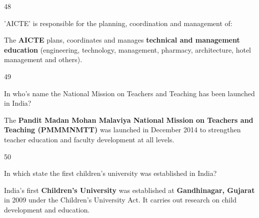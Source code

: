 \begin{question}{48}
{'AICTE' is responsible for the planning, coordination and management of:\par}
\begin{explain}
The \textbf{AICTE} plans, coordinates and manages \textbf{technical and management education} (engineering, technology, management, pharmacy, architecture, hotel management and others).
\end{explain}
\end{question}

\begin{question}{49}
{In who's name the National Mission on Teachers and Teaching has been launched in India?\par}
\begin{explain}
The \textbf{Pandit Madan Mohan Malaviya National Mission on Teachers and Teaching (PMMMNMTT)} was launched in December 2014 to strengthen teacher education and faculty development at all levels.
\end{explain}
\end{question}

\begin{question}{50}
{In which state the first children's university was established in India?\par}
\begin{explain}
India's first \textbf{Children's University} was established at \textbf{Gandhinagar, Gujarat} in 2009 under the Children's University Act. It carries out research on child development and education.
\end{explain}
\end{question}
